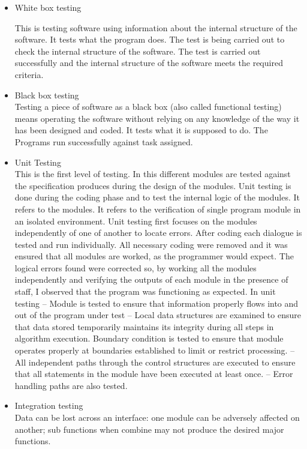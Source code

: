 \documentclass[12pt]{article}
\begin{document}
\begin{itemize}
\item White box testing

This is testing software using information about the internal structure of the software. It tests what the program does. The test is being carried out to check the internal structure of the software. The test is carried out successfully and the internal structure
of the software meets the required criteria.
\item Black box testing\\
Testing a piece of software as a black box (also called functional testing) means
operating the software without relying on any knowledge of the way it has been designed
and coded. It tests what it is supposed to do. The Programs run successfully against
task assigned.
\item  Unit Testing\\
This is the first level of testing. In this different modules are tested against the
specification produces during the design of the modules. Unit testing is done during
the coding phase and to test the internal logic of the modules. It refers to the modules.
It refers to the verification of single program module in an isolated environment.
Unit testing first focuses on the modules independently of one of another to locate errors.
After coding each dialogue is tested and run individually. All necessary coding were
removed and it was ensured that all modules are worked, as the programmer would
expect. The logical errors found were corrected so, by working all the modules independently and verifying the outputs of each module in the presence of staff, I observed
that the program was functioning as expected. In unit testing – Module is tested to
ensure that information properly flows into and out of the program under test – Local
data structures are examined to ensure that data stored temporarily maintains its integrity during all steps in algorithm execution. Boundary condition is tested to ensure
that module operates properly at boundaries established to limit or restrict processing.
– All independent paths through the control structures are executed to ensure that
all statements in the module have been executed at least once.
– Error handling paths are also tested.
\item Integration testing\\
Data can be lost across an interface: one module can be adversely affected on
another; sub functions when combine may not produce the desired major functions.

\end{itemize}
\end{document}
